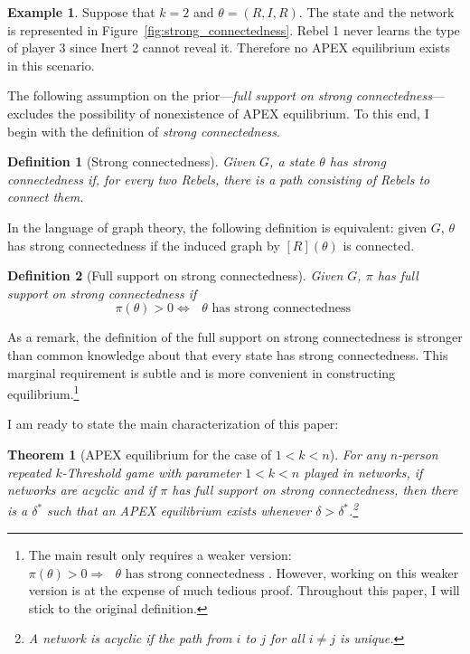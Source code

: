 \documentclass[12pt,letter]{article}
\newtheorem{theorem}{Theorem}
\newtheorem{definition}{Definition}[section]
\theoremstyle{definition}
\newtheorem{example}{Example}
\theoremstyle{remark}
\theoremstyle{claim}
\begin{document}
\begin{example}\label{ex_strong_connectedness}
Suppose that $k=2$ and $\theta=(R,I,R)$. The state and the network is represented in Figure~\ref{fig:strong_connectedness}. Rebel 1 never learns the type of player 3 since Inert 2 cannot reveal it. Therefore no APEX equilibrium exists in this scenario.
\end{example}

The following assumption on the prior---\textit{full support on strong connectedness}---excludes the possibility of nonexistence of APEX equilibrium. To this end, I begin with the definition of \textit{strong connectedness}.

\begin{definition}[Strong connectedness]
Given $G$, a state $\theta$ has strong connectedness if, for every two Rebels, there is a path consisting of Rebels to connect them.

\end{definition}  

In the language of graph theory, the following definition is equivalent: given $G$, $\theta$ has strong connectedness if the induced graph by $[R](\theta)$ is connected.

\begin{definition}[Full support on strong connectedness]
Given $G$, $\pi$ has full support on strong connectedness if 
\[\pi(\theta)>0\Leftrightarrow \text{ $\theta$ has strong connectedness }\] 
\end{definition}  

As a remark, the definition of the full support on strong connectedness is stronger than common knowledge about that every state has strong connectedness. This marginal requirement is subtle and is more convenient in constructing equilibrium.\footnote{The main result only requires a weaker version: $\pi(\theta)>0\Rightarrow \text{ $\theta$ has strong connectedness }$. However, working on this weaker version is at the expense of much tedious proof. Throughout this paper, I will stick to the original definition.} 

I am ready to state the main characterization of this paper:
\begin{theorem}[APEX equilibrium for the case of $1<k<n$]
\label{thm_main_result}
For any $n$-person repeated $k$-Threshold game with parameter $1<k<n$ played in networks, if networks are acyclic and if $\pi$ has full support on strong connectedness, then there is a $\delta^{*}$ such that an APEX equilibrium exists whenever $\delta>\delta^{*}$.\footnote{A network is acyclic if the path from $i$ to $j$ for all $i\neq j$ is unique.}

\end{theorem}
\end{document}
